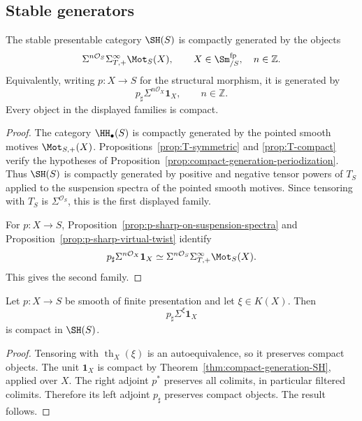 \subsection{Stable generators}

\begin{theorem}
\label{thm:compact-generation-SH}
The stable presentable category $\SH(S)$ is compactly generated by the objects
\[
    \Sigma^{n\mathcal O_S}
    \Sigma_{T,+}^\infty\Mot_S(X),
    \qquad
    X\in\Sm^{\mathrm{fp}}_{/S},
    \quad n\in\mathbb Z.
\]
Equivalently, writing $p:X\to S$ for the structural morphism, it is generated by
\[
    p_\sharp\Sigma^{n\mathcal O_X}\mathbf 1_X,
    \qquad n\in\mathbb Z.
\]
Every object in the displayed families is compact.
\end{theorem}

\begin{proof}
The category $\HH_\bullet(S)$ is compactly generated by the pointed smooth motives
$\Mot_{S,+}(X)$.  Propositions~\ref{prop:T-symmetric} and \ref{prop:T-compact} verify the hypotheses of
Proposition~\ref{prop:compact-generation-periodization}.  Thus $\SH(S)$ is compactly generated by
positive and negative tensor powers of $T_S$ applied to the suspension spectra of the pointed smooth
motives.  Since tensoring with $T_S$ is $\Sigma^{\mathcal O_S}$, this is the first displayed family.

For $p:X\to S$, Proposition~\ref{prop:p-sharp-on-suspension-spectra} and
Proposition~\ref{prop:p-sharp-virtual-twist} identify
\[
    p_\sharp\Sigma^{n\mathcal O_X}\mathbf 1_X
    \simeq
    \Sigma^{n\mathcal O_S}\Sigma_{T,+}^\infty\Mot_S(X).
\]
This gives the second family.
\end{proof}

\begin{corollary}
\label{cor:twisted-smooth-motives-compact}
Let $p:X\to S$ be smooth of finite presentation and let $\xi\in K(X)$.  Then
\[
    p_\sharp\Sigma^\xi\mathbf 1_X
\]
is compact in $\SH(S)$.
\end{corollary}

\begin{proof}
Tensoring with $\operatorname{th}_X(\xi)$ is an autoequivalence, so it preserves compact objects.
The unit $\mathbf 1_X$ is compact by Theorem~\ref{thm:compact-generation-SH}, applied over $X$.
The right adjoint $p^*$ preserves all colimits, in particular filtered colimits.  Therefore its left
adjoint $p_\sharp$ preserves compact objects.  The result follows.
\end{proof}

